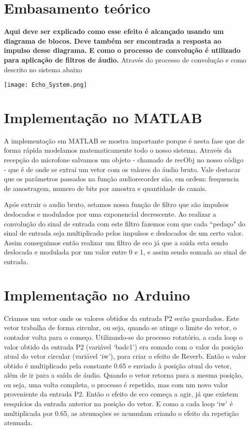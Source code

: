 \documentclass[a4paper, 12pt]{article}
\begin{document}
\newpage
\section{Embasamento teórico}
\textbf{Aqui deve ser explicado como esse efeito é alcançado usando um diagrama de blocos. Deve também ser encontrada a resposta ao impulso desse diagrama. E como o processo de convolução é utilizado para aplicação de filtros de áudio.}
\newline
Através do processo de convolução e como descrito no sistema abaixo 

\texttt{[image: Echo\_System.png]}
\newpage

\section{Implementação no MATLAB}
A implementação em MATLAB se mostra importante porque é nesta fase que de forma rápida modelamos matematicamente todo o nosso sistema. Através da recepção do microfone salvamos um objeto - chamado de recObj no nosso código - que é de onde se extrai um vetor com os valores do áudio bruto. Vale destacar que os parâmetros passados na função audiorecorder são, em ordem: frequencia de amostragem, numero de bits por amostra e quantidade de canais. \newline

Após extrair o audio bruto, setamos nossa função de filtro que são impulsos deslocados e modulados por uma exponencial decrescente. Ao realizar a convolução do sinal de entrada com este filtro fazemos com que cada ``pedaço" do sinal de entrada seja multiplicado pelos impulsos e deslocados de um certo valor. Assim conseguimos então realizar um filtro de eco já que a saida esta sendo deslocada e modulada por um valor entre 0 e 1, e assim sendo somada ao sinal de entrada.

\newpage

\section{Implementação no Arduino}
Criamos um vetor onde os valores obtidos da entrada P2 serão guardados. Este vetor trabalha de forma circular, ou seja, quando se atinge o limite do vetor, o contador volta para o começo. Utilizando-se do processo rotatório, a cada loop o valor obtido da entrada P2 (variável ‘badc1’) era somado com o valor da posição atual do vetor circular (variável ‘iw’), para criar o efeito de Reverb. Então o valor obtido é multiplicado pela constante 0.65 e enviado à posição atual do vetor, além de ir para a saída de áudio. Quando o vetor retorna para a mesma posição, ou seja, uma volta completa, o processo é repetido, mas com um novo valor proveniente da entrada P2. Então o efeito de eco começa a agir, já que existem resquícios da entrada anterior na posição do vetor. E como a cada loop ‘iw’ é multiplicada por 0.65, as atenuações se acumulam criando o efeito da repetição atenuada. 
\end{document}
